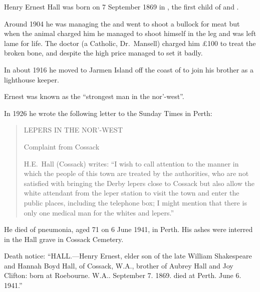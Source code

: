 
Henry Ernest Hall was born on 7 September 1869 in ,\cite{HEHDeathNotice}
the first child of  and .

Around 1904 he was managing the  and went to shoot a bullock for meat
but when the animal charged him he managed to shoot himself in the leg and was left lame for life.
The doctor (a Catholic, Dr.~Mansell) charged him \pounds 100 to treat the broken bone,
and despite the high price managed to set it badly.

In about 1916 he moved to Jarmen Island off the coast of 
to join his brother  as a lighthouse keeper.\cite{Connie1983}

Ernest was known as the ``strongest man in the nor'-west''.\cite{ErnestHallInscription}

In 1926 he wrote the following letter to the Sunday Times in Perth:\cite{Lepers1926}

\begin{quotation}
LEPERS IN THE NOR'-WEST

Complaint from Cossack

H.E.\ Hall (Cossack) writes:
``I wish to call attention to the manner in which the people of this town are treated by the authorities,
who are not satisfied with bringing the Derby lepers close to Cossack but also allow the white attendant from the leper
station to visit the town and enter the public places, including the telephone box;
I might mention that there is only one medical man for the whites and lepers.''
\end{quotation}

He died of pneumonia,\cite{ErnestHallInscription} aged 71 on 6 June 1941, in Perth.\cite{HEHDeathNotice}
His ashes were interred in the Hall grave in Cossack Cemetery.\cite{ErnestHallInscription}

Death notice:\cite{HEHDeathNotice}
``HALL.—Henry Ernest, elder son of the late William Shakespeare and Hannah Boyd Hall, of Cossack, W.A.,
brother of Aubrey Hall and Joy Clifton: born at Roebourne. W.A.. September 7. 1869. died at Perth. June 6. 1941.''
